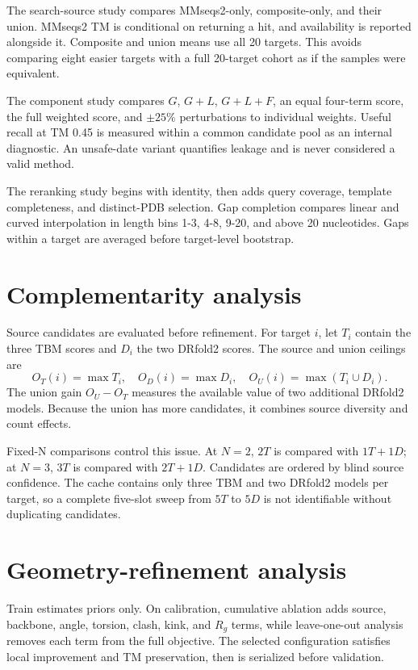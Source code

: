\documentclass[12pt,a4paper,oneside]{report}
\begin{document}
The search-source study compares MMseqs2-only, composite-only, and their union. MMseqs2
TM is conditional on returning a hit, and availability is reported alongside it.
Composite and union means use all 20 targets. This avoids comparing eight easier targets
with a full 20-target cohort as if the samples were equivalent.

The component study compares $G$, $G+L$, $G+L+F$, an equal four-term score, the full
weighted score, and $\pm25\%$ perturbations to individual weights. Useful recall at TM
0.45 is measured within a common candidate pool as an internal diagnostic. An
unsafe-date variant quantifies leakage and is never considered a valid method.

The reranking study begins with identity, then adds query coverage, template completeness,
and distinct-PDB selection. Gap completion compares linear and curved interpolation in
length bins 1-3, 4-8, 9-20, and above 20 nucleotides. Gaps within a target are averaged
before target-level bootstrap.

\section{Complementarity analysis}

Source candidates are evaluated before refinement. For target $i$, let $T_i$ contain the
three TBM scores and $D_i$ the two DRfold2 scores. The source and union ceilings are
\begin{equation}
O_T(i)=\max T_i,\quad O_D(i)=\max D_i,\quad
O_U(i)=\max(T_i\cup D_i).
\end{equation}
The union gain $O_U-O_T$ measures the available value of two additional DRfold2 models.
Because the union has more candidates, it combines source diversity and count effects.

Fixed-N comparisons control this issue. At $N=2$, $2T$ is compared with $1T+1D$; at
$N=3$, $3T$ is compared with $2T+1D$. Candidates are ordered by blind source confidence.
The cache contains only three TBM and two DRfold2 models per target, so a complete
five-slot sweep from $5T$ to $5D$ is not identifiable without duplicating candidates.

\section{Geometry-refinement analysis}

Train estimates priors only. On calibration, cumulative ablation adds source, backbone,
angle, torsion, clash, kink, and $R_g$ terms, while leave-one-out analysis removes each
term from the full objective. The selected configuration satisfies local improvement and
TM preservation, then is serialized before validation.
\end{document}
